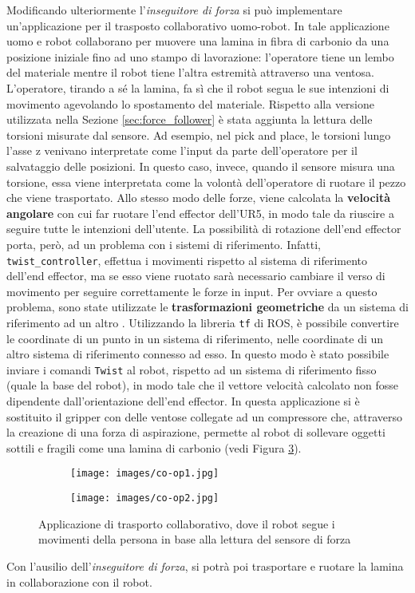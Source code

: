 Modificando ulteriormente l'\textit{inseguitore di forza} si pu\`{o} implementare un'applicazione 
per il trasposto collaborativo uomo-robot\footnotemark{}. 
In tale applicazione uomo e robot collaborano per muovere una lamina in fibra di carbonio da una posizione iniziale fino ad uno stampo 
di lavorazione: l'operatore tiene un lembo del materiale mentre il robot tiene l'altra estremit\`{a} attraverso una ventosa. 
L'operatore, tirando a s\'{e} la lamina, fa s\`{i} che il robot segua le sue intenzioni di movimento agevolando lo spostamento del materiale.
Rispetto alla versione utilizzata nella Sezione \ref{sec:force_follower} \`{e} stata aggiunta 
la lettura delle torsioni misurate dal sensore. 
Ad esempio, nel pick and place, le torsioni lungo l'asse z venivano interpretate come l'input da parte dell'operatore per il salvataggio 
delle posizioni. In questo caso, invece, quando il sensore misura una torsione, essa viene interpretata come la volont\`{a} 
dell'operatore di ruotare il pezzo che viene trasportato.
Allo stesso modo delle forze, viene calcolata la \textbf{velocit\`{a} angolare} 
con cui far ruotare l'end effector dell'UR5, in modo tale da riuscire a seguire tutte le intenzioni dell'utente. 
La possibilit\`{a} di rotazione dell'end effector porta, per\`{o}, ad un problema con i sistemi di riferimento. 
Infatti, \verb|twist_controller|, effettua i movimenti rispetto al sistema di riferimento dell'end effector, ma se esso viene ruotato 
sar\`{a} necessario cambiare il verso di movimento per seguire correttamente le forze in input. Per ovviare a questo 
problema, sono state utilizzate le \textbf{trasformazioni geometriche} da un sistema di riferimento ad un altro \cite{foote2013tf}. 
Utilizzando la libreria \verb|tf| di ROS, \`{e} possibile convertire le coordinate di un punto in un sistema di riferimento, nelle 
coordinate di un altro sistema di riferimento connesso ad esso. In questo modo \`{e} stato possibile inviare i comandi 
\verb|Twist| al robot, rispetto ad un sistema di riferimento fisso (quale la base del robot), in modo tale che il vettore velocit\`{a} 
calcolato non fosse dipendente dall'orientazione dell'end effector. 
In questa applicazione si \`{e} sostituito il gripper con delle ventose collegate ad un compressore che, attraverso la creazione di 
una forza di aspirazione, permette al robot di sollevare oggetti sottili e fragili come una lamina di carbonio (vedi Figura \ref{fig:co-op}).
\begin{figure}[H]
    \centering
    \begin{subfigure}[b]{0.45\textwidth}
        \texttt{[image: images/co-op1.jpg]}
        \label{fig:co-op1}
    \end{subfigure}
    \qquad
    \begin{subfigure}[b]{0.45\textwidth}
        \texttt{[image: images/co-op2.jpg]}
        \label{fig:co-op2}
    \end{subfigure}
    \caption{Applicazione di trasporto collaborativo, dove il robot segue i movimenti della persona in base alla lettura del sensore di forza}\label{fig:co-op}
\end{figure}
\newpage
Con l'ausilio dell'\textit{inseguitore di forza}, si potr\`{a} poi trasportare e ruotare la lamina in collaborazione con il robot. 

